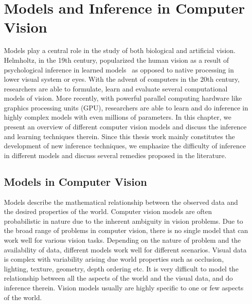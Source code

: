 \chapter{Models and Inference in Computer Vision}
\label{chap:models}

Models play a central role in the study of both biological and artificial
vision. Helmholtz, in the 19th century, popularized the human vision as a result
of psychological inference in learned models~\cite{frey2003advances,cahan1993hermann}
as opposed to native processing in lower visual system or eyes.
With the advent of computers in the 20th century, researchers are able to
formulate, learn and evaluate several computational models of vision.
More recently, with powerful parallel computing hardware like graphics processing units
(GPU), researchers are able to learn and do inference in highly complex models with even millions
of parameters. In this chapter, we present an overview of different computer vision models and
discuss the inference and learning techniques therein. Since this thesis work
mainly constitutes the development of new inference techniques, we emphasize the
difficulty of inference in different models and discuss several remedies proposed
in the literature.

\section{Models in Computer Vision}

Models describe the mathematical relationship between the observed data and the
desired properties of the world. Computer vision models are often
probabilistic in nature due to the inherent ambiguity in vision problems.
Due to the broad range of problems in computer vision, there is no single model
that can work well for various vision tasks. Depending on the nature of problem and
the availability of data, different models work well for different scenarios.
Visual data is complex with variability arising due
world properties such as occlusion, lighting, texture, geometry, depth ordering
etc. It is very difficult to model the relationship between all the aspects of the world
and the visual data, and do inference therein. Vision models usually are highly
specific to one or few aspects of the world.

